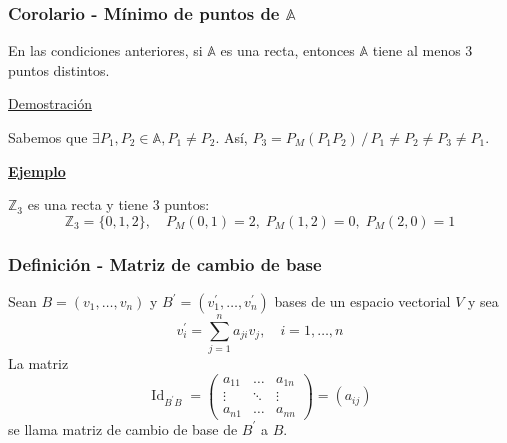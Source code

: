 \documentclass[12pt, a4paper, ones, notitlepage, openany,titlepage]{article}
\newcommand{\demostracion}{\noindent\underline{Demostración}}
\newcommand{\ejemplo}{\noindent\underline{\textbf{Ejemplo}}}
\begin{document}
\subsubsection{Corolario - Mínimo de puntos de $\mathbb{A}$}
En las condiciones anteriores, si $\mathbb{A}$ es una recta, entonces $\mathbb{A}$ tiene al menos $3$ puntos distintos.

\demostracion

\noindent Sabemos que $\exists P_1, P_2 \in \mathbb{A}, P_1 \neq P_2$. Así, $P_3 = P_M(P_1 P_2) \,/\, P_1 \neq P_2 \neq P_3 \neq P_1$.

\ejemplo

\noindent $\mathbb{Z}_3$ es una recta y tiene $3$ puntos:
$$
\mathbb{Z}_3 = \{0,1,2\}, \quad P_M(0,1) = 2, \; P_M(1,2) = 0, \; P_M(2,0) = 1
$$

\subsubsection{Definición - Matriz de cambio de base}
\noindent Sean $B=\left(v_{1}, \ldots, v_{n}\right)$ y $B^{\prime}=\left(v_{1}^{\prime}, \ldots, v_{n}^{\prime}\right)$ bases de un espacio vectorial $V$ y sea
$$
v_i^{\prime}=\sum_{j=1}^{n} a_{j i} v_{j}, \quad i=1, \ldots, n
$$
La matriz
$$
\operatorname{Id}_{B^{\prime} B}=\left(\begin{array}{rrr}
	a_{11} & \ldots & a_{1 n} \\
	\vdots & \ddots & \vdots \\
	a_{n 1} & \ldots & a_{n n}
\end{array}\right)=\left(a_{i j}\right)
$$
se llama matriz de cambio de base de $B^{\prime}$ a $B$.
\end{document}
